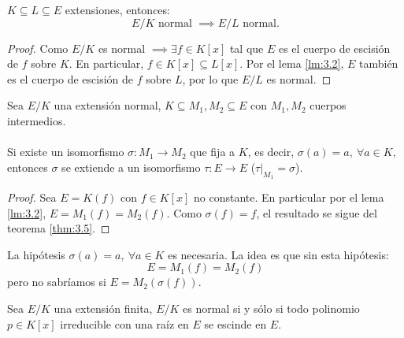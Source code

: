 
\begin{lm}\label{lm:3.7}
    $K \subseteq L \subseteq E$ extensiones, entonces:
    $$
        E/K \text{ normal } \implies E/L \text{ normal.}
    $$
\end{lm}

\begin{proof}
    Como $E/K$ es normal $\implies \exists f \in K[x]$ tal que $E$ es el cuerpo de escisión de $f$ sobre $K$. En particular, $f \in K[x] \subseteq L[x]$. Por el lema \ref{lm:3.2}, $E$ también es el cuerpo de escisión de $f$ sobre $L$, por lo que $E/L$ es normal.
\end{proof}

\begin{cor}\label{cor:3.8}
    Sea $E/K$ una extensión normal, $K \subseteq M_1, M_2 \subseteq E$ con $M_1, M_2$ cuerpos intermedios.\\\\
    Si existe un isomorfismo $\sigma: M_1 \to M_2$ que fija a $K$, es decir, $\sigma(a) = a,\ \forall a \in K$, entonces $\sigma$ se extiende a un isomorfismo $\tau: E \to E$ ($\left. \tau \right|_{M_1} = \sigma$).
\end{cor}
\begin{proof}
    Sea $E = K(f)$ con $f \in K[x]$ no constante. En particular por el lema \ref{lm:3.2}, $E = M_1(f) = M_2(f)$. Como $\sigma(f) = f$, el resultado se sigue del teorema \ref{thm:3.5}.
\end{proof}
\begin{obs}
    La hipótesis $\sigma(a) = a,\ \forall a \in K$ es necesaria. La idea es que sin esta hipótesis:
    $$
        E = M_1(f) = M_2(f)
    $$
    pero no sabríamos si $E = M_2(\sigma(f))$.
\end{obs}

\begin{thm}\label{thm:3.9}
    Sea $E/K$ una extensión finita, $E/K$ es normal si y sólo si todo polinomio $p \in K[x]$ irreducible con una raíz en $E$ se escinde en $E$.
\end{thm}

